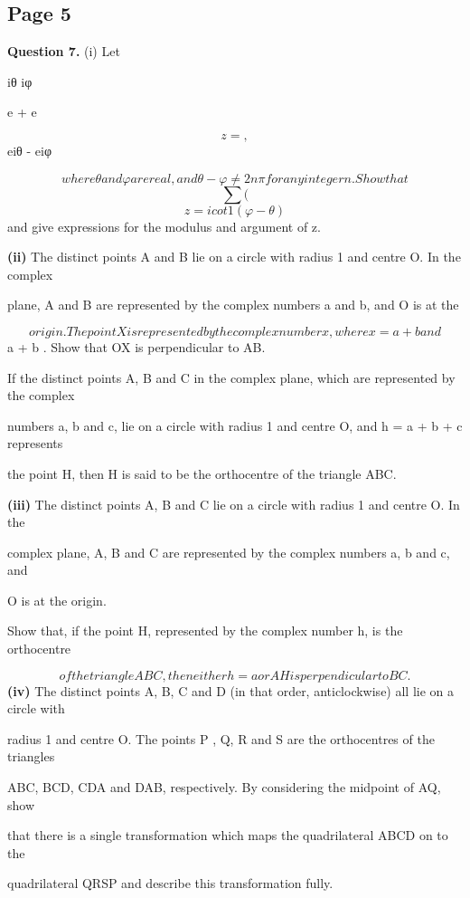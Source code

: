 \documentclass[12pt]{article}
\begin{document}
\subsection*{Page 5}
\begin{flushleft}
\bigskip\textbf{Question 7.} (i) Let\par
iθ iφ\par
e + e\par
\[z = ,\]
eiθ - eiφ\par
\[where θ and φ are real, and θ - φ \ne 2n\pi for any integer n. Show that\]
\[\sum (\]
\[z = i cot 1 (φ - θ)\]
and give expressions for the modulus and argument of z.\par
\textbf{(ii)} The distinct points A and B lie on a circle with radius 1 and centre O. In the complex\par
plane, A and B are represented by the complex numbers a and b, and O is at the\par
\[origin. The point X is represented by the complex number x, where x = a + b and\]
a + b . Show that OX is perpendicular to AB.\par
If the distinct points A, B and C in the complex plane, which are represented by the complex\par
numbers a, b and c, lie on a circle with radius 1 and centre O, and h = a + b + c represents\par
the point H, then H is said to be the orthocentre of the triangle ABC.\par
\textbf{(iii)} The distinct points A, B and C lie on a circle with radius 1 and centre O. In the\par
complex plane, A, B and C are represented by the complex numbers a, b and c, and\par
O is at the origin.\par
Show that, if the point H, represented by the complex number h, is the orthocentre\par
\[of the triangle ABC, then either h = a or AH is perpendicular to BC.\]
\textbf{(iv)} The distinct points A, B, C and D (in that order, anticlockwise) all lie on a circle with\par
radius 1 and centre O. The points P , Q, R and S are the orthocentres of the triangles\par
ABC, BCD, CDA and DAB, respectively. By considering the midpoint of AQ, show\par
that there is a single transformation which maps the quadrilateral ABCD on to the\par
quadrilateral QRSP and describe this transformation fully.\par
\end{flushleft}
\end{document}
